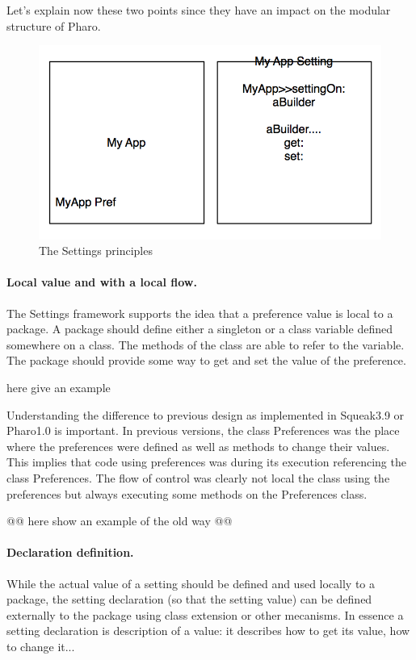\documentclass[a4paper,10pt,twoside]{book}
\begin{document}
Let's explain now these two points since they have an impact on the modular structure of Pharo. 

\begin{figure}[tbh]
\begin{center}
\includegraphics[scale=0.3]{Principles}
\caption{The Settings principles}
\end{center}
\end{figure}

\paragraph{Local value and with a local flow.}

The Settings framework supports the idea that a preference value is local to a package. A package should define either a singleton or a class variable defined somewhere on a class. The methods of the class are able to refer to the variable. The package should provide some way to get and set the value of the preference.

here give an example

Understanding the difference to previous design as implemented in Squeak3.9 or Pharo1.0 is important.
In previous versions, the class Preferences was the place where the preferences were defined as well as methods to change their values. This implies that code using preferences was during its execution referencing the class Preferences.
The flow of control was clearly not local the class using the preferences but always executing some methods on the Preferences class.



@@
here show an example of the old way
@@


\paragraph{Declaration definition.}
While the actual value of a setting should be defined and used locally to a package, the setting declaration (so that the setting value) can be defined externally to the package using class extension or other mecanisms.
In essence a setting declaration is description of a value: it describes how to get its value, how to change it...
\end{document}
